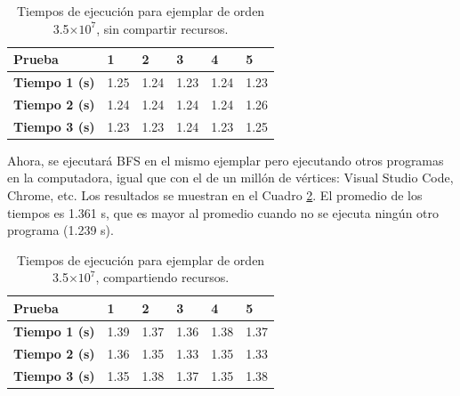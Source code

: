 \documentclass{article}
\begin{document}
\begin{table}[htbp]
\begin{center}
\begin{tabular}{|l|l|l|l|l|l|}
\hline
\textbf{Prueba} & \textbf{1} & \textbf{2} & \textbf{3} & \textbf{4} & \textbf{5} \\ \hline
\textbf{Tiempo 1 (s)} & 1.25 & 1.24 & 1.23 & 1.24 & 1.23 \\ \hline
\textbf{Tiempo 2 (s)} & 1.24 & 1.24 & 1.24 & 1.24 & 1.26 \\ \hline
\textbf{Tiempo 3 (s)} & 1.23 & 1.23 & 1.24 & 1.23 & 1.25 \\ \hline


\end{tabular}
\caption{Tiempos de ejecución para ejemplar de orden 3.5$\times 10^7$, sin compartir recursos.} \label{table:4}
\end{center}
\end{table}

Ahora, se ejecutará BFS en el mismo ejemplar pero ejecutando otros programas en la computadora, igual que con el de un millón de vértices: Visual Studio Code, Chrome, etc. Los resultados se muestran en el Cuadro \ref{table:5}. El promedio de los tiempos es 1.361 s, que es mayor al promedio cuando no se ejecuta ningún otro programa (1.239 s).

\begin{table}[htbp]
\begin{center}
\begin{tabular}{|l|l|l|l|l|l|}
\hline
\textbf{Prueba} & \textbf{1} & \textbf{2} & \textbf{3} & \textbf{4} & \textbf{5} \\ \hline
\textbf{Tiempo 1 (s)} & 1.39 & 1.37 & 1.36 & 1.38 & 1.37 \\ \hline
\textbf{Tiempo 2 (s)} & 1.36 & 1.35 & 1.33 & 1.35 & 1.33 \\ \hline
\textbf{Tiempo 3 (s)} & 1.35 & 1.38 & 1.37 & 1.35 & 1.38 \\ \hline


\end{tabular}
\caption{Tiempos de ejecución para ejemplar de orden 3.5$\times 10^7$, compartiendo recursos.} \label{table:5}
\end{center}
\end{table}
\end{document}
